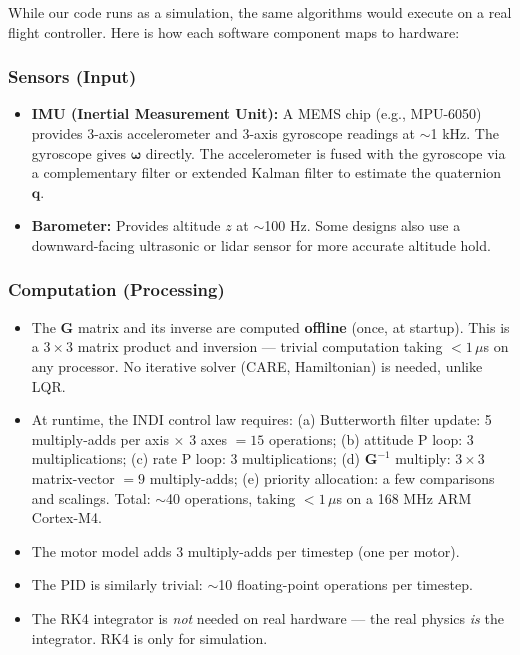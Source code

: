 \documentclass[12pt, a4paper]{article}
\newcommand{\bq}{\bm{q}}
\newcommand{\bomega}{\bm{\omega}}
\begin{document}
While our code runs as a simulation, the same algorithms would execute on a real flight controller.  Here is how each software component maps to hardware:

\subsubsection{Sensors (Input)}
\begin{itemize}
    \item \textbf{IMU (Inertial Measurement Unit):} A MEMS chip (e.g., MPU-6050) provides 3-axis accelerometer and 3-axis gyroscope readings at $\sim$1 kHz.  The gyroscope gives $\bomega$ directly.  The accelerometer is fused with the gyroscope via a complementary filter or extended Kalman filter to estimate the quaternion $\bq$.
    \item \textbf{Barometer:} Provides altitude $z$ at $\sim$100 Hz.  Some designs also use a downward-facing ultrasonic or lidar sensor for more accurate altitude hold.
\end{itemize}

\subsubsection{Computation (Processing)}
\begin{itemize}
    \item The $\bm{G}$ matrix and its inverse are computed \textbf{offline} (once, at startup).  This is a $3 \times 3$ matrix product and inversion --- trivial computation taking $< 1\,\mu$s on any processor.  No iterative solver (CARE, Hamiltonian) is needed, unlike LQR.
    \item At runtime, the INDI control law requires: (a) Butterworth filter update: 5 multiply-adds per axis $\times$ 3 axes $= 15$ operations; (b) attitude P loop: 3 multiplications; (c) rate P loop: 3 multiplications; (d) $\bm{G}^{-1}$ multiply: $3 \times 3$ matrix-vector $= 9$ multiply-adds; (e) priority allocation: a few comparisons and scalings.  Total: $\sim$40 operations, taking $< 1\,\mu$s on a 168 MHz ARM Cortex-M4.
    \item The motor model adds 3 multiply-adds per timestep (one per motor).
    \item The PID is similarly trivial: $\sim$10 floating-point operations per timestep.
    \item The RK4 integrator is \emph{not} needed on real hardware --- the real physics \emph{is} the integrator.  RK4 is only for simulation.
\end{itemize}
\end{document}
